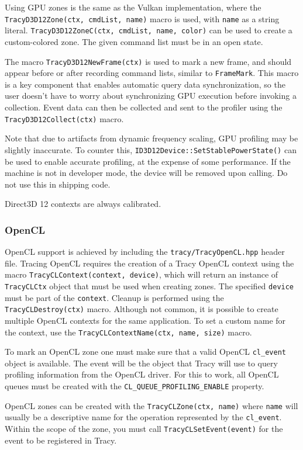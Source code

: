 \documentclass[hidelinks,titlepage,a4paper]{article}
\begin{document}
Using GPU zones is the same as the Vulkan implementation, where the \texttt{TracyD3D12Zone(ctx, cmdList, name)} macro is used, with \texttt{name} as a string literal. \texttt{TracyD3D12ZoneC(ctx, cmdList, name, color)} can be used to create a custom-colored zone. The given command list must be in an open state.

The macro \texttt{TracyD3D12NewFrame(ctx)} is used to mark a new frame, and should appear before or after recording command lists, similar to \texttt{FrameMark}. This macro is a key component that enables automatic query data synchronization, so the user doesn't have to worry about synchronizing GPU execution before invoking a collection. Event data can then be collected and sent to the profiler using the \texttt{TracyD3D12Collect(ctx)} macro.

Note that due to artifacts from dynamic frequency scaling, GPU profiling may be slightly inaccurate. To counter this, \texttt{ID3D12Device::SetStablePowerState()} can be used to enable accurate profiling, at the expense of some performance. If the machine is not in developer mode, the device will be removed upon calling. Do not use this in shipping code.

Direct3D 12 contexts are always calibrated.

\subsubsection{OpenCL}

OpenCL support is achieved by including the \texttt{tracy/TracyOpenCL.hpp} header file. Tracing OpenCL requires the creation of a Tracy OpenCL context using the macro \texttt{TracyCLContext(context, device)}, which will return an instance of \texttt{TracyCLCtx} object that must be used when creating zones. The specified \texttt{device} must be part of the \texttt{context}. Cleanup is performed using the \texttt{TracyCLDestroy(ctx)} macro. Although not common, it is possible to create multiple OpenCL contexts for the same application. To set a custom name for the context, use the \texttt{TracyCLContextName(ctx, name, size)} macro.

To mark an OpenCL zone one must make sure that a valid OpenCL \texttt{cl\_event} object is available. The event will be the object that Tracy will use to query profiling information from the OpenCL driver. For this to work, all OpenCL queues must be created with the \texttt{CL\_QUEUE\_PROFILING\_ENABLE} property.

OpenCL zones can be created with the \texttt{TracyCLZone(ctx, name)} where \texttt{name} will usually be a descriptive name for the operation represented by the \texttt{cl\_event}. Within the scope of the zone, you must call \texttt{TracyCLSetEvent(event)} for the event to be registered in Tracy.
\end{document}
